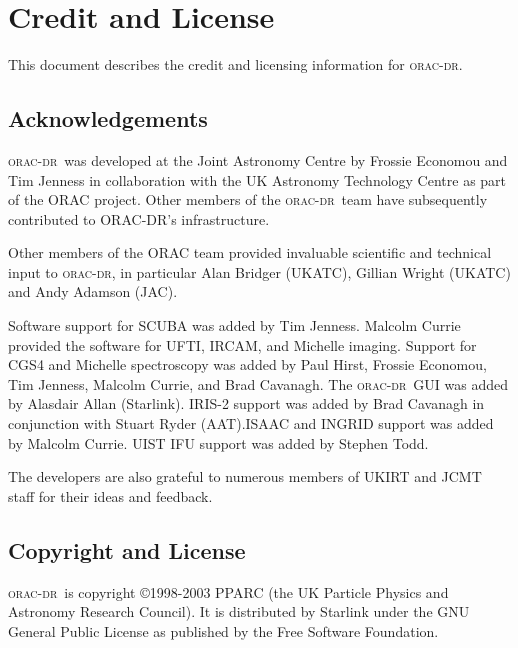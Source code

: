 \documentclass[twoside,11pt]{article}
\renewcommand{\_}{\texttt{\symbol{95}}}
\newcommand{\oracdr}{\textsc{orac-dr}}
\begin{document}
\section{Credit and License}

This document describes the credit and licensing information for \oracdr.

\subsection*{Acknowledgements\label{ORAC-DR_Acknowledgements}}

\oracdr\ was developed at the Joint Astronomy Centre by
Frossie Economou and Tim Jenness in collaboration with the
UK Astronomy Technology Centre as part of the ORAC project. 
Other members of the \oracdr\ team have subsequently contributed
to ORAC-DR's infrastructure.



Other members of the ORAC team provided invaluable scientific 
and technical input to \oracdr, in particular Alan Bridger (UKATC),
Gillian Wright (UKATC) and Andy Adamson (JAC).



Software support for SCUBA was added by Tim Jenness.  Malcolm Currie
provided the software for UFTI, IRCAM, and Michelle imaging.  Support
for CGS4 and Michelle spectroscopy was added by Paul Hirst, Frossie
Economou, Tim Jenness, Malcolm Currie, and Brad Cavanagh.  The \oracdr\
GUI was added by Alasdair Allan (Starlink). IRIS-2 support was added
by Brad Cavanagh in conjunction with Stuart Ryder (AAT).ISAAC and
INGRID support was added by Malcolm Currie. UIST IFU support was added
by Stephen Todd.



The developers are also grateful to numerous members of UKIRT and JCMT
staff for their ideas and feedback.

\subsection*{Copyright and License\label{ORAC-DR_Copyright_and_License}}

\oracdr\ is copyright \copyright 1998-2003 PPARC (the UK Particle Physics and Astronomy
Research Council). It is distributed by Starlink under the
GNU General Public License as published by the Free Software Foundation.
\end{document}
